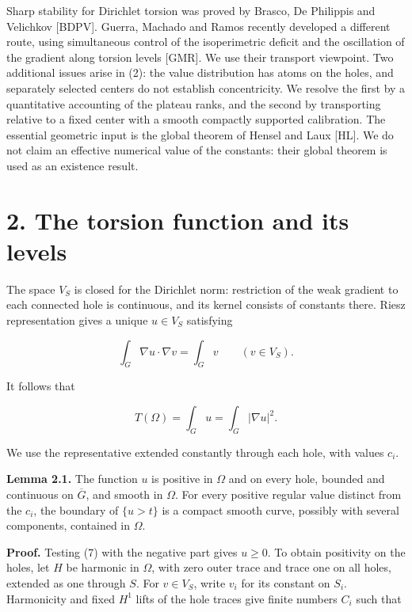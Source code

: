 \documentclass[11pt]{article}
\begin{document}
Sharp stability for Dirichlet torsion was proved by Brasco, De Philippis
and Velichkov {[}BDPV{]}. Guerra, Machado and Ramos recently developed a
different route, using simultaneous control of the isoperimetric deficit
and the oscillation of the gradient along torsion levels {[}GMR{]}. We
use their transport viewpoint. Two additional issues arise in (2): the
value distribution has atoms on the holes, and separately selected
centers do not establish concentricity. We resolve the first by a
quantitative accounting of the plateau ranks, and the second by
transporting relative to a fixed center with a smooth compactly
supported calibration. The essential geometric input is the global
theorem of Hensel and Laux {[}HL{]}. We do not claim an effective
numerical value of the constants: their global theorem is used as an
existence result.

\section{2. The torsion function and its
levels}\label{the-torsion-function-and-its-levels}

The space \(V_S\) is closed for the Dirichlet norm: restriction of the
weak gradient to each connected hole is continuous, and its kernel
consists of constants there. Riesz representation gives a unique
\(u\in V_S\) satisfying

\[
\int_G\nabla u\cdot\nabla v=\int_Gv\qquad(v\in V_S).
\tag{7}
\]

It follows that

\[
T(\Omega)=\int_Gu=\int_G|\nabla u|^2.
\tag{8}
\]

We use the representative extended constantly through each hole, with
values \(c_i\).

\textbf{Lemma 2.1.} The function \(u\) is positive in \(\Omega\) and on
every hole, bounded and continuous on \(\overline G\), and smooth in
\(\Omega\). For every positive regular value distinct from the \(c_i\),
the boundary of \(\{u>t\}\) is a compact smooth curve, possibly with
several components, contained in \(\Omega\).

\textbf{Proof.} Testing (7) with the negative part gives \(u\ge0\). To
obtain positivity on the holes, let \(H\) be harmonic in \(\Omega\),
with zero outer trace and trace one on all holes, extended as one
through \(S\). For \(v\in V_S\), write \(v_i\) for its constant on
\(S_i\). Harmonicity and fixed \(H^1\) lifts of the hole traces give
finite numbers \(C_i\) such that
\end{document}

